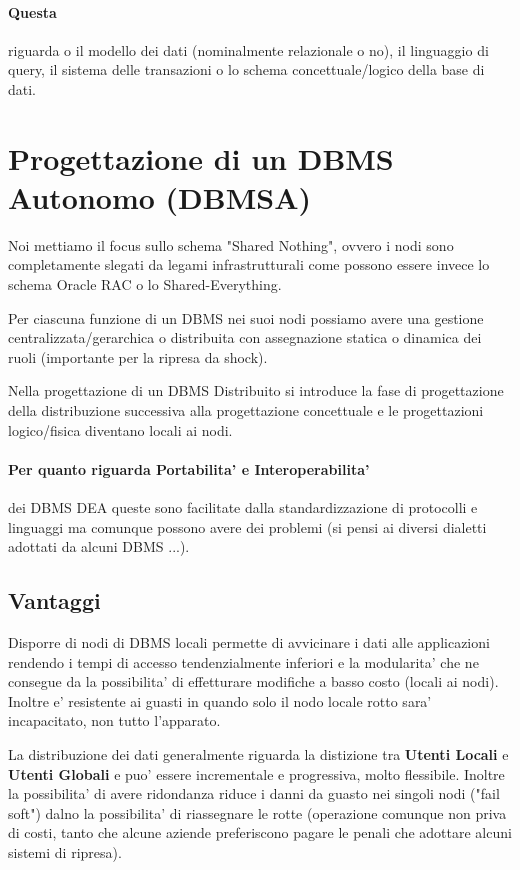 \paragraph{Questa} riguarda o il modello dei dati (nominalmente relazionale o no), il linguaggio di query, il sistema delle transazioni o lo schema concettuale/logico della base di dati.

\section{Progettazione di un DBMS Autonomo (DBMSA)}

Noi mettiamo il focus sullo schema "Shared Nothing", ovvero i nodi sono completamente slegati da legami infrastrutturali come possono essere invece lo schema Oracle RAC o lo Shared-Everything.


Per ciascuna funzione di un DBMS nei suoi nodi possiamo avere una gestione centralizzata/gerarchica o distribuita con assegnazione statica o dinamica dei ruoli (importante per la ripresa da shock).

Nella progettazione di un DBMS Distribuito si introduce la fase di progettazione della distribuzione successiva alla progettazione concettuale e le progettazioni logico/fisica diventano locali ai nodi.

\paragraph{Per quanto riguarda Portabilita' e Interoperabilita'} dei DBMS DEA queste sono facilitate dalla standardizzazione di protocolli e linguaggi ma comunque possono avere dei problemi (si pensi ai diversi dialetti adottati da alcuni DBMS ...).

\subsection{Vantaggi}

Disporre di nodi di DBMS locali permette di avvicinare i dati alle applicazioni rendendo i tempi di accesso tendenzialmente inferiori e la modularita' che ne consegue da la possibilita' di effetturare modifiche a basso costo (locali ai nodi).
Inoltre e' resistente ai guasti in quando solo il nodo locale rotto sara' incapacitato, non tutto l'apparato.

La distribuzione dei dati generalmente riguarda la distizione tra \textbf{Utenti Locali} e \textbf{Utenti Globali} e puo' essere incrementale e progressiva, molto flessibile.
Inoltre la possibilita' di avere ridondanza riduce i danni da guasto nei singoli nodi ("fail soft") dalno la possibilita' di riassegnare le rotte (operazione comunque non priva di costi, tanto che alcune aziende preferiscono pagare le penali che adottare alcuni sistemi di ripresa).


